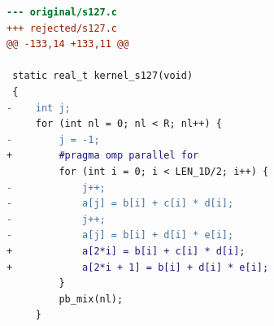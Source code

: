 \begin{lstlisting}[language=diff,basicstyle=\ttfamily\scriptsize,breaklines=true,caption={tsvc/s127 — attempt 2 of 3, rejected by the gate at 'tsan': Race detected: / WARNING: ThreadSanitizer: data race (pid=3470197)}]
--- original/s127.c
+++ rejected/s127.c
@@ -133,14 +133,11 @@
 
 static real_t kernel_s127(void)
 {
-    int j;
     for (int nl = 0; nl < R; nl++) {
-        j = -1;
+        #pragma omp parallel for 
         for (int i = 0; i < LEN_1D/2; i++) {
-            j++;
-            a[j] = b[i] + c[i] * d[i];
-            j++;
-            a[j] = b[i] + d[i] * e[i];
+            a[2*i] = b[i] + c[i] * d[i];
+            a[2*i + 1] = b[i] + d[i] * e[i];
         }
         pb_mix(nl);
     }
\end{lstlisting}
